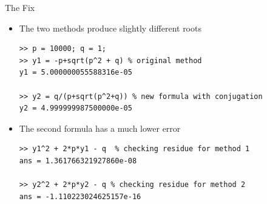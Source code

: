 \documentclass[10pt]{beamer}
\begin{document}



\begin{frame}[fragile]{The Fix}
\begin{itemize}
    \item The two methods produce slightly different roots 
\begin{lstlisting} 
>> p = 10000; q = 1;
>> y1 = -p+sqrt(p^2 + q) % original method
y1 = 5.000000055588316e-05  

>> y2 = q/(p+sqrt(p^2+q)) % new formula with conjugation
y2 = 4.999999987500000e-05  
\end{lstlisting} 

\item The second formula has a much lower error
\begin{lstlisting} 
>> y1^2 + 2*p*y1 - q  % checking residue for method 1
ans = 1.361766321927860e-08

>> y2^2 + 2*p*y2 - q % checking residue for method 2 
ans = -1.110223024625157e-16
\end{lstlisting} 

\end{itemize}
\end{frame}
\end{document}
